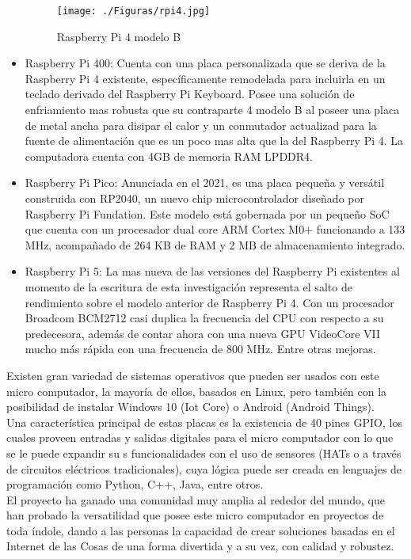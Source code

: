 \begin{itemize}
\begin{figure}[htb]
\centering
\texttt{[image: ./Figuras/rpi4.jpg]}
\caption{Raspberry Pi 4 modelo B}
\label{fig:rpi4}
\vspace*{-10pt}
\end{figure}

\item Raspberry Pi 400: Cuenta con una placa personalizada que se deriva de la Raspberry Pi 4 existente, específicamente remodelada para incluirla en un teclado derivado del Raspberry Pi Keyboard. Posee una solución de enfriamiento mas robusta que su contraparte 4 modelo B al poseer una placa de metal ancha para disipar el calor y un conmutador actualizad para la fuente de alimentación que es un poco mas alta que la del Raspberry Pi 4. La computadora cuenta con 4GB de memoria RAM LPDDR4.
\item Raspberry Pi Pico: Anunciada en el 2021, es una placa pequeña y versátil construida con RP2040, un nuevo chip microcontrolador diseñado por Raspberry Pi Fundation. Este modelo está gobernada por un pequeño SoC que cuenta con un procesador dual core ARM Cortex M0+ funcionando a 133 MHz, acompañado de 264 KB de RAM y 2 MB de almacenamiento integrado.
\item Raspberry Pi 5: La mas nueva de las versiones del Raspberry Pi existentes al momento de la escritura de esta investigación representa el salto de rendimiento sobre el modelo anterior de Raspberry Pi 4. Con un procesador  Broadcom BCM2712 casi duplica la frecuencia del CPU con respecto a su predecesora, además de contar ahora con una nueva GPU VideoCore VII mucho más rápida con una frecuencia de 800 MHz. Entre otras mejoras.
\end{itemize}
Existen gran variedad de sistemas operativos que pueden ser usados con este micro computador, la mayoría de ellos, basados en Linux, pero también con la posibilidad de instalar Windows 10 (Iot Core) o Android (Android Things).\\

Una característica principal de estas placas es la existencia de 40 pines GPIO, los cuales proveen entradas y salidas digitales para el micro computador con lo que se le puede expandir su s funcionalidades con el uso de sensores (HATs o a través de circuitos eléctricos tradicionales), cuya lógica puede ser creada en lenguajes de programación como Python, C++, Java, entre otros.\\

El proyecto ha ganado una comunidad muy amplia al rededor del mundo, que han probado la versatilidad que posee este micro computador en proyectos de toda índole, dando a las personas la capacidad de crear soluciones basadas en el Internet de las Cosas de una forma divertida y a su vez, con calidad y robustez.

